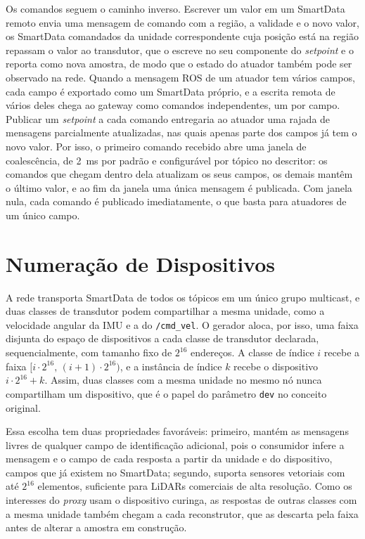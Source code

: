 \documentclass[
    12pt,
    oneside,
    a4paper,
    chapter=TITLE,
    section=TITLE,
    english,
    brazil
]{abntex2}
\begin{document}
Os comandos seguem o caminho inverso. Escrever um valor em um SmartData
remoto envia uma mensagem de comando com a região, a validade e o novo
valor, os SmartData comandados da unidade correspondente cuja posição está
na região repassam o valor ao transdutor, que o escreve no seu componente
do \textit{setpoint} e o reporta como nova amostra, de modo que o estado do
atuador também pode ser observado na rede. Quando a mensagem ROS de um
atuador tem vários campos, cada campo é exportado como um SmartData
próprio, e a escrita remota de vários deles chega ao gateway como comandos
independentes, um por campo. Publicar um \textit{setpoint} a cada comando
entregaria ao atuador uma rajada de mensagens parcialmente atualizadas,
nas quais apenas parte dos campos já tem o novo valor. Por isso, o
primeiro comando recebido abre uma janela de coalescência, de
\SI{2}{\milli\second} por padrão e configurável por tópico no descritor:
os comandos que chegam dentro dela atualizam os seus campos, os demais
mantêm o último valor, e ao fim da janela uma única mensagem é publicada.
Com janela nula, cada comando é publicado imediatamente, o que basta para
atuadores de um único campo.

\section{Numeração de Dispositivos}
\label{sec:dev-base}

A rede transporta SmartData de todos os tópicos em um único grupo
multicast, e duas classes de transdutor podem compartilhar a mesma
unidade, como a velocidade angular da IMU e a do \texttt{/cmd\_vel}. O
gerador aloca, por isso, uma faixa disjunta do espaço de dispositivos a
cada classe de transdutor declarada, sequencialmente, com tamanho fixo de
\(2^{16}\) endereços. A classe de índice \(i\) recebe a faixa
\([i \cdot 2^{16},\,(i+1) \cdot 2^{16})\), e a instância de índice \(k\)
recebe o dispositivo \(i \cdot 2^{16} + k\). Assim, duas classes com a
mesma unidade no mesmo nó nunca compartilham um dispositivo, que é o
papel do parâmetro \texttt{dev} no conceito original.

Essa escolha tem duas propriedades favoráveis: primeiro, mantém as
mensagens livres de qualquer campo de identificação adicional, pois o
consumidor infere a mensagem e o campo de cada resposta a partir da
unidade e do dispositivo, campos que já existem no SmartData; segundo,
suporta sensores vetoriais com até \(2^{16}\) elementos, suficiente para
LiDARs comerciais de alta resolução. Como os interesses do
\textit{proxy} usam o dispositivo curinga, as respostas de outras classes
com a mesma unidade também chegam a cada reconstrutor, que as descarta
pela faixa antes de alterar a amostra em construção.
\end{document}
